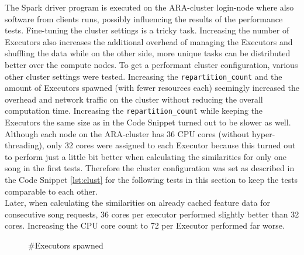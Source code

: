 \noindent The Spark driver program is executed on the ARA-cluster login-node where also software from clients runs, possibly influencing the results of the performance tests. Fine-tuning the cluster settings is a tricky task. Increasing the number of Executors also increases the additional overhead of managing the Executors and shuffling the data while on the other side, more unique tasks can be distributed better over the compute nodes. To get a performant cluster configuration, various other cluster settings were tested. Increasing the \lstinline{repartition_count} and the amount of Executors spawned (with fewer resources each) seemingly increased the overhead and network traffic on the cluster without reducing the overall computation time. Increasing the \lstinline{repartition_count} while keeping the Executors the same size as in the Code Snippet turned out to be slower as well.\\ 
Although each node on the ARA-cluster has 36 CPU cores (without hyper-threading), only 32 cores were assigned to each Executor because this turned out to perform just a little bit better when calculating the similarities for only one song in the first tests. Therefore the cluster configuration was set as described in the Code Snippet \ref{lst:clust} for the following tests in this section to keep the tests comparable to each other.\\
Later, when calculating the similarities on already cached feature data for consecutive song requests, 36 cores per executor performed slightly better than 32 cores. Increasing the CPU core count to 72 per Executor performed far worse.\\ 

\FloatBarrier
\begin{figure}[htbp]
   	\centering
   	\caption{\#Executors spawned}
   	\label{perfspark7}
\end{figure}
\FloatBarrier

